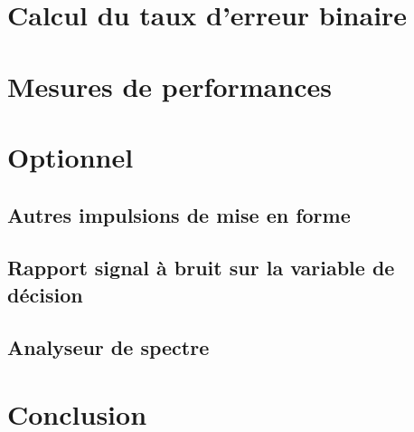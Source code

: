 \documentclass{acm_proc_article-sp}
\begin{document}
\section{Calcul du taux d'erreur binaire}


\section{Mesures de performances}


\section{Optionnel}
\subsection{Autres impulsions de mise en forme}
\subsection{Rapport signal à bruit sur la variable de décision}
\subsection{Analyseur de spectre}


\section{Conclusion}


\nocite{*}

\balancecolumns
\end{document}
